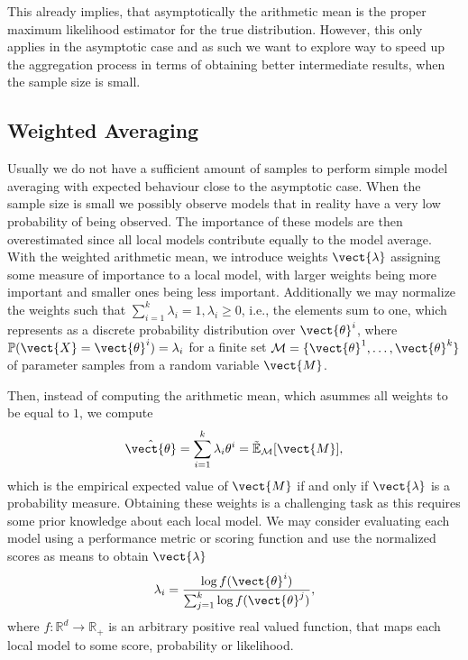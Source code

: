 This already implies, that asymptotically the arithmetic mean is the proper maximum likelihood estimator for the true distribution. 
However, this only applies in the asymptotic case and as such we want to explore way to speed up the aggregation process in terms of obtaining better intermediate results, when the sample size is small.

\subsection{Weighted Averaging}
Usually we do not have a sufficient amount of samples to perform simple model averaging with expected behaviour close to the asymptotic case. 
When the sample size is small we possibly observe models that in reality have a very low probability of being observed. 
The importance of these models are then overestimated since all local models contribute equally to the model average.
With the weighted arithmetic mean, we introduce  weights $\vect{\lambda}$ assigning some measure of importance to a local model, with larger weights being more important and smaller ones being less important.
Additionally we may normalize the weights such that $\sum_{i=1}^k \lambda_i = 1, \lambda_i \geq 0$, i.e., the elements sum to one, which represents as a discrete probability distribution over $\vect{\theta}^i$, where $\mathbb{P}(\vect{X} = \vect{\theta}^i) = \lambda_i$ for a finite set $\mathcal{M} = \{\vect{\theta}^1, \ldots, \vect{\theta}^k\}$ of parameter samples from a random variable $\vect{M}$.

Then, instead of computing the arithmetic mean, which asummes all weights to be equal to $1$, we compute
\begin{equation}
     \hat{\vect{\theta}} = \sum_{i=1}^k \lambda_i \theta^i = \tilde{\mathbb{E}}_{\mathcal{M}}[\vect{M}],
\end{equation}
which is the empirical expected value of $\vect{M}$ if and only if $\vect{\lambda}$ is a probability measure.
Obtaining these weights is a challenging task as this requires some prior knowledge about each local model.
We may consider evaluating each model using a performance metric or scoring function and use the normalized scores as means to obtain $\vect{\lambda}$
\begin{equation}
    \lambda_i = \frac{\log f(\vect{\theta}^i)}{\sum_{j=1}^k \log f(\vect{\theta}^j)},
\end{equation}
where $f: \mathbb{R}^d \rightarrow \mathbb{R}_+$ is an arbitrary positive real valued function, that maps each local model to some score, probability or likelihood.

